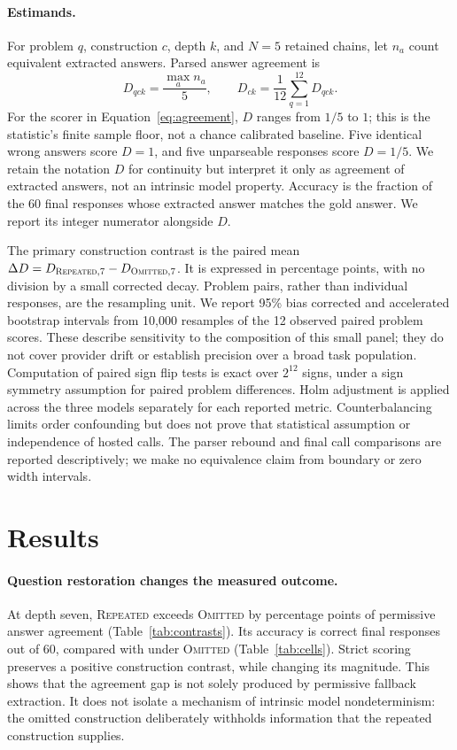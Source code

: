 \documentclass{article}
\newcommand{\dropq}{\textsc{Omitted}}
\newcommand{\fixed}{\textsc{Repeated}}
\begin{document}
\paragraph{Estimands.}
For problem $q$, construction $c$, depth $k$, and $N=5$ retained chains, let $n_a$ count equivalent extracted answers. Parsed answer agreement is
\begin{equation}
D_{qck}=\frac{\max_a n_a}{5},\qquad
D_{ck}=\frac{1}{12}\sum_{q=1}^{12}D_{qck}.
\label{eq:agreement}
\end{equation}
For the scorer in Equation~\ref{eq:agreement}, $D$ ranges from $1/5$ to $1$; this is the statistic's finite sample floor, not a chance calibrated baseline. Five identical wrong answers score $D=1$, and five unparseable responses score $D=1/5$. We retain the notation $D$ for continuity but interpret it only as agreement of extracted answers, not an intrinsic model property. Accuracy is the fraction of the 60 final responses whose extracted answer matches the gold answer. We report its integer numerator alongside $D$.

The primary construction contrast is the paired mean $\Delta D=D_{\fixed,7}-D_{\dropq,7}$. It is expressed in percentage points, with no division by a small corrected decay. Problem pairs, rather than individual responses, are the resampling unit. We report 95\% bias corrected and accelerated bootstrap intervals from 10,000 resamples of the 12 observed paired problem scores. These describe sensitivity to the composition of this small panel; they do not cover provider drift or establish precision over a broad task population. Computation of paired sign flip tests is exact over $2^{12}$ signs, under a sign symmetry assumption for paired problem differences. Holm adjustment is applied across the three models separately for each reported metric. Counterbalancing limits order confounding but does not prove that statistical assumption or independence of hosted calls. The parser rebound and final call comparisons are reported descriptively; we make no equivalence claim from boundary or zero width intervals.

\section{Results}
\label{sec:results}
\paragraph{Question restoration changes the measured outcome.}
At depth seven, \fixed{} exceeds \dropq{} by \GapRange{} percentage points of permissive answer agreement (Table~\ref{tab:contrasts}). Its accuracy is \FixedAccuracyRange{} correct final responses out of 60, compared with \OmittedAccuracyRange{} under \dropq{} (Table~\ref{tab:cells}). Strict scoring preserves a positive construction contrast, while changing its magnitude. This shows that the agreement gap is not solely produced by permissive fallback extraction. It does not isolate a mechanism of intrinsic model nondeterminism: the omitted construction deliberately withholds information that the repeated construction supplies.
\end{document}
